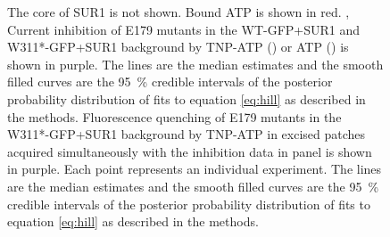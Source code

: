 \begin{figure}[hbtp]
{	The core of SUR1 is not shown.
	Bound ATP is shown in red.
	,  Current inhibition of E179 mutants in the WT-GFP+SUR1 and W311*-GFP+SUR1 background by TNP-ATP () or ATP () is shown in purple.
	The lines are the median estimates and the smooth filled curves are the \SI{95}{\percent} credible intervals of the posterior probability distribution of fits to equation \ref{eq:hill} as described in the methods.
	 Fluorescence quenching of E179 mutants in the W311*-GFP+SUR1 background by TNP-ATP in excised patches acquired simultaneously with the inhibition data in panel  is shown in purple.
	Each point represents an individual experiment.
	The lines are the median estimates and the smooth filled curves are the \SI{95}{\percent} credible intervals of the posterior probability distribution of fits to equation \ref{eq:hill} as described in the methods.
	}\label{ch5fig:e179_1}
\end{figure}

